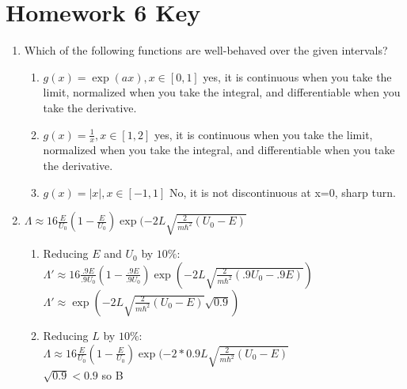\documentclass{article}
\begin{document}
\section*{Homework 6 Key}
 
\begin{enumerate}%

\item Which of the following functions are well-behaved over the given intervals?
    \begin{enumerate}
    \item $g(x)=\exp(ax),x\in[0,1]$ yes, it is continuous when you take the limit, normalized when you take the integral, and differentiable when you take the derivative.
    \item $g(x)=\frac{1}{x}, x\in[1,2]$ yes, it is continuous when you take the limit, normalized when you take the integral, and differentiable when you take the derivative.
    \item $g(x)=|x|,x\in[-1,1]$ No, it is not discontinuous at x=0, sharp turn.
    \end{enumerate}
\item $\Lambda \approx 16\frac{E}{U_0}(1-\frac{E}{U_0})\exp(-2L\sqrt{\frac{2}{m\hbar^2}(U_0-E)}$\
    \begin{enumerate}
    \item Reducing $E$ and $U_0$ by $10\%$:
    \\ $\Lambda' \approx 16\frac{.9E}{.9U_0}(1-\frac{.9E}{.9U_0})\exp\left(-2L\sqrt{\frac{2}{m\hbar^2}(.9U_0-.9E)}\right)$
    \\ $\Lambda' \approx \exp\left(-2L\sqrt{\frac{2}{m\hbar^2}(U_0-E)}\sqrt{0.9}\right)$
    \item Reducing $L$ by $10\%$:
    \\ $\Lambda \approx 16\frac{E}{U_0}(1-\frac{E}{U_0})\exp(-2*0.9L\sqrt{\frac{2}{m\hbar^2}(U_0-E)}$
    \\ $\sqrt{0.9}<0.9$ so B
    

\end{enumerate}
\end{enumerate}
\end{document}
